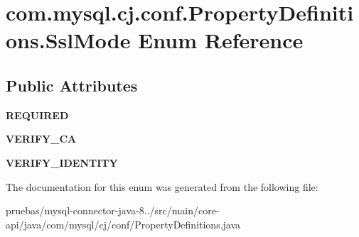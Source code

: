 \hypertarget{enumcom_1_1mysql_1_1cj_1_1conf_1_1_property_definitions_1_1_ssl_mode}{}\section{com.\+mysql.\+cj.\+conf.\+Property\+Definitions.\+Ssl\+Mode Enum Reference}
\label{enumcom_1_1mysql_1_1cj_1_1conf_1_1_property_definitions_1_1_ssl_mode}
\subsection*{Public Attributes}
\begin{DoxyCompactItemize}
\item 
\mbox{\label{enumcom_1_1mysql_1_1cj_1_1conf_1_1_property_definitions_1_1_ssl_mode_a31ebc638e0d832a99397fcfe35d14cfb}} 
{\bfseries R\+E\+Q\+U\+I\+R\+ED}
\item 
\mbox{\label{enumcom_1_1mysql_1_1cj_1_1conf_1_1_property_definitions_1_1_ssl_mode_aa72e6fc6a4d82a79a15e26c2b6793950}} 
{\bfseries V\+E\+R\+I\+F\+Y\+\_\+\+CA}
\item 
\mbox{\label{enumcom_1_1mysql_1_1cj_1_1conf_1_1_property_definitions_1_1_ssl_mode_a4ccc31de5998b5419181d2a002c17209}} 
{\bfseries V\+E\+R\+I\+F\+Y\+\_\+\+I\+D\+E\+N\+T\+I\+TY}
\end{DoxyCompactItemize}


The documentation for this enum was generated from the following file\+:\begin{DoxyCompactItemize}
\item 
pruebas/mysql-\/connector-\/java-\/8../src/main/core-\/api/java/com/mysql/cj/conf/Property\+Definitions.\+java\end{DoxyCompactItemize}
